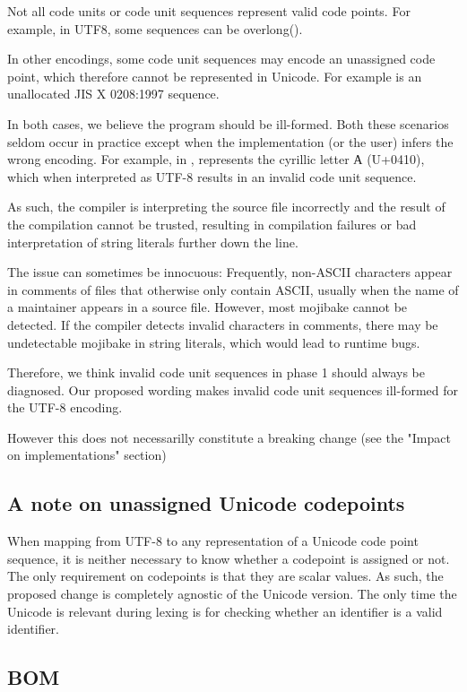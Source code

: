 \documentclass{wg21}
\begin{document}
Not all code units or code unit sequences represent valid code points.
For example, in UTF8, some sequences can be overlong().

In other encodings, some code unit sequences may encode an unassigned code point, which therefore cannot be represented in Unicode.
For example  is an unallocated JIS X 0208:1997 sequence.

In both cases, we believe the program should be ill-formed.
Both these scenarios seldom occur in practice except when the implementation (or the user) infers the wrong encoding.
For example, in ,  represents the cyrillic letter А (U+0410), which when interpreted
as UTF-8 results in an invalid code unit sequence.

As such, the compiler is interpreting the source file incorrectly and the result of the compilation cannot be trusted,
resulting in compilation failures or bad interpretation of string literals further down the line.

The issue can sometimes be innocuous:
Frequently, non-ASCII characters appear in comments of files that otherwise only contain ASCII, usually when the name of
a maintainer appears in a source file.
However, most mojibake cannot be detected. If the compiler detects invalid characters in comments, there may be undetectable
mojibake in string literals, which would lead to runtime bugs.

Therefore, we think invalid code unit sequences in phase 1 should always be diagnosed.
Our proposed wording makes invalid code unit sequences ill-formed for the UTF-8 encoding.

However this does not necessarilly constitute a breaking change (see the "Impact on implementations" section)

\subsection{A note on unassigned Unicode codepoints}

When mapping from UTF-8 to any representation of a Unicode code point sequence, it is neither necessary to know
whether a codepoint is assigned or not.
The only requirement on codepoints is that they are scalar values.
As such, the proposed change is completely agnostic of the Unicode version.
The only time the Unicode is relevant during lexing is for checking whether an identifier is a valid identifier.

\subsection{BOM}
\end{document}
